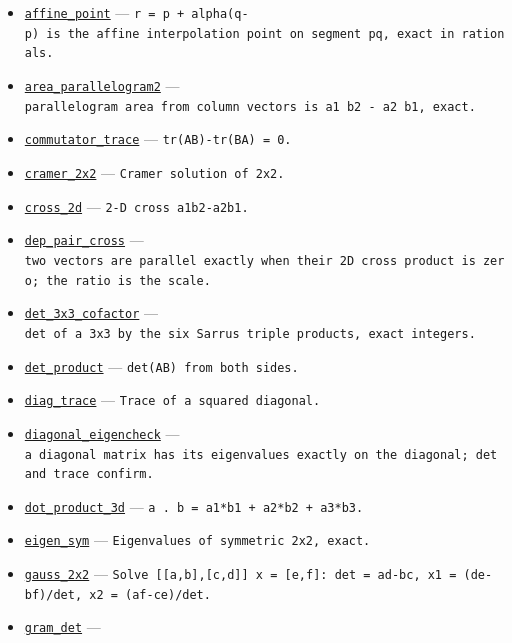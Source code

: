 \documentclass[
  10pt,
]{article}
\providecommand{\tightlist}{%
  \setlength{\itemsep}{0pt}\setlength{\parskip}{0pt}}
\begin{document}
\begin{itemize}
\tightlist
\item
  \href{../generation_1/I3/algos_i3.py}{\texttt{affine\_point}} ---
  \texttt{r\ =\ p\ +\ alpha(q-p)\ is\ the\ affine\ interpolation\ point\ on\ segment\ pq,\ exact\ in\ rationals.}
\item
  \href{../generation_1/I3/algos_i3.py}{\texttt{area\_parallelogram2}}
  ---
  \texttt{parallelogram\ area\ from\ column\ vectors\ is\ \textbar{}a1\ b2\ -\ a2\ b1\textbar{},\ exact.}
\item
  \href{../generation_1/I1/algos_gen1_big.py}{\texttt{commutator\_trace}}
  --- \texttt{tr(AB)-tr(BA)\ =\ 0.}
\item
  \href{../generation_1/I1/algos_gen1_big.py}{\texttt{cramer\_2x2}} ---
  \texttt{Cramer\ solution\ of\ 2x2.}
\item
  \href{../generation_1/I1/algos_gen1_big.py}{\texttt{cross\_2d}} ---
  \texttt{2-D\ cross\ a1b2-a2b1.}
\item
  \href{../generation_1/I3/algos_i3.py}{\texttt{dep\_pair\_cross}} ---
  \texttt{two\ vectors\ are\ parallel\ exactly\ when\ their\ 2D\ cross\ product\ is\ zero;\ the\ ratio\ is\ the\ scale.}
\item
  \href{../generation_1/I3/algos_i3.py}{\texttt{det\_3x3\_cofactor}} ---
  \texttt{det\ of\ a\ 3x3\ by\ the\ six\ Sarrus\ triple\ products,\ exact\ integers.}
\item
  \href{../generation_1/I1/algos_gen1_big.py}{\texttt{det\_product}} ---
  \texttt{det(AB)\ from\ both\ sides.}
\item
  \href{../generation_1/I1/algos_gen1_big.py}{\texttt{diag\_trace}} ---
  \texttt{Trace\ of\ a\ squared\ diagonal.}
\item
  \href{../generation_1/I3/algos_i3.py}{\texttt{diagonal\_eigencheck}}
  ---
  \texttt{a\ diagonal\ matrix\ has\ its\ eigenvalues\ exactly\ on\ the\ diagonal;\ det\ and\ trace\ confirm.}
\item
  \href{../tools/prm/algos.py}{\texttt{dot\_product\_3d}} ---
  \texttt{a\ .\ b\ =\ a1*b1\ +\ a2*b2\ +\ a3*b3.}
\item
  \href{../generation_1/I1/algos_gen1_big.py}{\texttt{eigen\_sym}} ---
  \texttt{Eigenvalues\ of\ symmetric\ 2x2,\ exact.}
\item
  \href{../tools/prm/algos.py}{\texttt{gauss\_2x2}} ---
  \texttt{Solve\ {[}{[}a,b{]},{[}c,d{]}{]}\ x\ =\ {[}e,f{]}:\ det\ =\ ad-bc,\ x1\ =\ (de-bf)/det,\ x2\ =\ (af-ce)/det.}
\item
  \href{../generation_1/I1/algos_gen1_big.py}{\texttt{gram\_det}} ---

\end{itemize}
\end{document}
